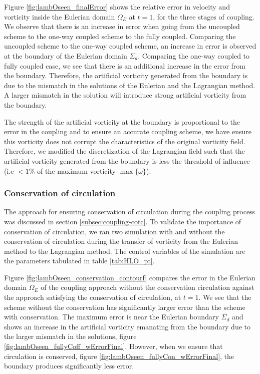 Figure \ref{fig:lambOseen_finalError} shows the relative error in velocity and vorticity inside the Eulerian domain $\Omega_E$ at $t=1$, for the three stages of coupling. We observe that there is an increase in error when going from the uncoupled scheme to the one-way coupled scheme to the fully coupled. Comparing the uncoupled scheme to the one-way coupled scheme, an increase in error is observed at the boundary of the Eulerian domain $\Sigma_d$.  Comparing the one-way coupled to fully coupled case, we see that there is an additional increase in the error from the boundary. Therefore, the artificial vorticity generated from the boundary is due to the mismatch in the solutions of the Eulerian and the Lagrangian method. A larger mismatch in the solution will introduce strong artificial vorticity from the boundary.

The strength of the artificial vorticity at the boundary is proportional to the error in the coupling and to ensure an accurate coupling scheme, we have ensure this vorticity does not corrupt the characteristics of the original vorticity field. Therefore, we modified the discretization of the Lagrangian field such that the artificial vorticity generated from the boundary is less the threshold of influence (i.e $<1\%$ of the maximum vorticity $\max\{\omega\}$).

\subsubsection{Conservation of circulation}
\label{subsubsec:coc}

The approach for ensuring conservation of circulation during the coupling process was discussed in section 	\ref{subsec:coupling-cotc}. To validate the importance of conservation of circulation, we ran two simulation with and without the conservation of circulation during the transfer of vorticity from the Eulerian method to the Lagrangian method. The control variables of the simulation are the parameters tabulated in table \ref{tab:HLO_pt}.

Figure \ref{fig:lambOseen_conservation_contourf} compares the error in the Eulerian domain $\Omega_E$ of the coupling approach without the conservation circulation against the approach satisfying the conservation of circulation, at $t=1$. We see that the scheme without the conservation has significantly larger error than the scheme with conservation. The maximum error is near the Eulerian boundary $\Sigma_d$ and shows an increase in the artificial vorticity emanating from the boundary due to the larger mismatch in the solutions, figure \ref{fig:lambOseen_fullyCoff_wErrorFinal}. However, when we ensure that circulation is conserved, figure \ref{fig:lambOseen_fullyCon_wErrorFinal}, the boundary produces significantly less error.

